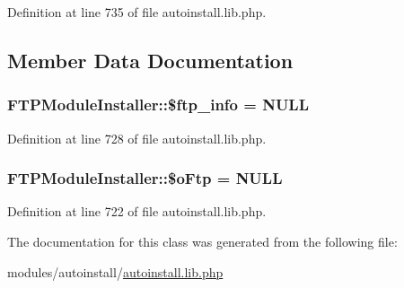 Definition at line 735 of file autoinstall.\-lib.\-php.



\subsection{Member Data Documentation}
\hypertarget{classFTPModuleInstaller_afd92e3672f27df9d0056f759cfb4206c}{
\subsubsection[{\$ftp\-\_\-info}]{\setlength{\rightskip}{0pt plus 5cm}F\-T\-P\-Module\-Installer\-::\$ftp\-\_\-info = N\-U\-L\-L}}\label{classFTPModuleInstaller_afd92e3672f27df9d0056f759cfb4206c}


Definition at line 728 of file autoinstall.\-lib.\-php.

\hypertarget{classFTPModuleInstaller_a7df6cf65240fbb39a7d763e10b236dc9}{
\subsubsection[{\$o\-Ftp}]{\setlength{\rightskip}{0pt plus 5cm}F\-T\-P\-Module\-Installer\-::\$o\-Ftp = N\-U\-L\-L}}\label{classFTPModuleInstaller_a7df6cf65240fbb39a7d763e10b236dc9}


Definition at line 722 of file autoinstall.\-lib.\-php.



The documentation for this class was generated from the following file\-:\begin{DoxyCompactItemize}
\item 
modules/autoinstall/\hyperlink{autoinstall_8lib_8php}{autoinstall.\-lib.\-php}\end{DoxyCompactItemize}

